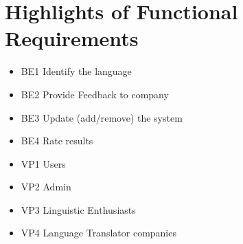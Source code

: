 \section{Highlights of Functional Requirements}
\label{sec:functional_requirements}


\begin{itemize}
	\item BE1 Identify the language
	\item BE2 Provide Feedback to company
	\item BE3 Update (add/remove) the system
	\item BE4 Rate results
\end{itemize}

\begin{itemize}
	\item VP1 Users
	\item VP2 Admin
	\item VP3 Linguistic Enthusiasts
	\item VP4 Language Translator companies
\end{itemize}



